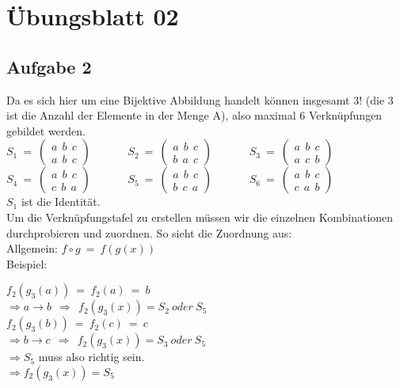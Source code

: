\documentclass[12pt,a4paper,headsepline]{scrreprt}
\begin{document}


\section*{Übungsblatt 02}

\subsection*{Aufgabe 2}
Da es sich hier um eine Bijektive Abbildung handelt können insgesamt 3! (die 3 ist die Anzahl der Elemente in der Menge A), also maximal 6 Verknüpfungen gebildet werden.\\

$ S_1 ~=~ \left( \begin{array}{c}
a~~b~~c\\
a~~b~~c
\end{array} \right)$~~~~~~
$ S_2 ~=~ \left( \begin{array}{c}
a~~b~~c\\
b~~a~~c
\end{array} \right)$~~~~~~
$ S_3 ~=~ \left( \begin{array}{c}
a~~b~~c\\
a~~c~~b
\end{array} \right)$\\
$ S_4 ~=~ \left( \begin{array}{c}
a~~b~~c\\
c~~b~~a
\end{array} \right)$~~~~~~
$ S_5 ~=~ \left( \begin{array}{c}
a~~b~~c\\
b~~c~~a
\end{array} \right)$~~~~~~
$ S_6 ~=~ \left( \begin{array}{c}
a~~b~~c\\
c~~a~~b
\end{array} \right)$\\

$S_1$ ist die Identität.\\

Um die Verknüpfungstafel zu erstellen müssen wir die einzelnen Kombinationen durchprobieren und zuordnen. So sieht die Zuordnung aus:\\

Allgemein: $f \circ g ~=~ f(g(x))$\\
Beispiel:
\begin{center}
$f_2(g_3(a)) ~=~ f_2(a) ~=~ b$\\
$\Rightarrow a \rightarrow b ~~\Rightarrow~~ f_2(g_3(x)) = S_2 ~oder~ S_5$\\
$f_2(g_3(b)) ~=~ f_2(c) ~=~ c$\\
$\Rightarrow b \rightarrow c ~~\Rightarrow~~ f_2(g_3(x)) = S_3 ~oder~ S_5$\\
$\Rightarrow S_5$ muss also richtig sein.\\
$\Rightarrow f_2(g_3(x)) = S_5$
\end{center}
\end{document}
